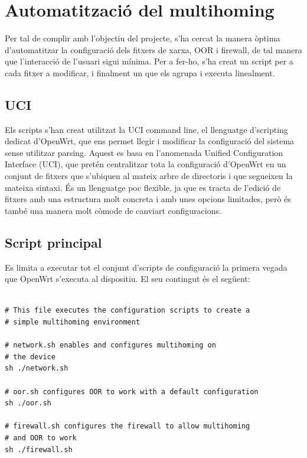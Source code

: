 \documentclass[11pt]{article}
\begin{document}
\section{Automatització del multihoming}
Per tal de complir amb l’objectiu del projecte, s’ha cercat la manera òptima d’automatitzar la configuració dels fitxers de xarxa, OOR i firewall, de tal manera que l’interacció de l’usuari sigui mínima. Per a fer-ho, s’ha creat un script per a cada fitxer a modificar, i finalment un que els agrupa i executa linealment. 
\subsection{UCI}
Els scripts s’han creat utilitzat la UCI command line, el llenguatge d’scripting dedicat d’OpenWrt, que ens permet llegir i modificar la configuració del sistema sense utilitzar parsing\cite{uci16}. Aquest es basa en l’anomenada Unified Configuration Interface (UCI), que pretén centralitzar tota la configuració d’OpenWrt en un conjunt de fitxers que s’ubiquen al mateix arbre de directoris i que segueixen la mateixa sintaxi. És un llenguatge poc flexible, ja que es tracta de l’edició de fitxers amb una estructura molt concreta i amb unes opcions limitades, però és també una manera molt còmode de canviart configuracions.
\subsection{Script principal}
Es limita a executar tot el conjunt d’scripts de configuració la primera vegada que OpenWrt s’executa al dispositiu. El seu contingut és el següent:\\
\lstset{language=sh, caption=Script principal d'automatització}
\begin{lstlisting}[frame=single]

# This file executes the configuration scripts to create a
# simple multihoming environment

# network.sh enables and configures multihoming on 
# the device
sh ./network.sh

# oor.sh configures OOR to work with a default configuration
sh ./oor.sh

# firewall.sh configures the firewall to allow multihoming 
# and OOR to work
sh ./firewall.sh
\end{lstlisting}
\end{document}
